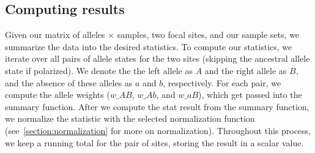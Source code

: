 \documentclass[12pt]{article}
\begin{document}
\subsection{Computing results}\label{section:computing_results}

Given our matrix of alleles $\times$ samples, two focal sites, and our sample
sets, we summarize the data into the desired statistics. To compute our
statistics, we iterate over all pairs of allele states for the two sites
(skipping the ancestral allele state if polarized). We denote the the left
allele as $A$ and the right allele as $B$, and the absence of these alleles as
$a$ and $b$, respectively. For each pair, we compute the allele weights
($w\_AB$, $w\_Ab$, and $w\_aB$), which get passed into the summary
function. After we compute the stat result from the summary function, we
normalize the statistic with the selected normalization function
(see~\ref{section:normalization} for more on normalization). Throughout this
process, we keep a running total for the pair of sites, storing the result in a
scalar value.
\end{document}
